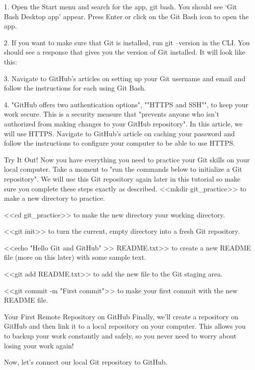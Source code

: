             1. Open the Start menu and search for the app, git bash. You should see ‘Git Bash Desktop app’ appear. Press Enter or click on the Git Bash icon to open the app.

            2. If you want to make sure that Git is installed, run git --version in the CLI. You should see a response that gives you the version of Git installed. It will look like this:

            3. Navigate to GitHub’s articles on setting up your Git username and email and follow the instructions for each using Git Bash.

            4. "GitHub offers two authentication options", ""HTTPS and SSH"", to keep your work secure. This is a security measure that "prevents anyone who isn’t authorized from making changes to your GitHub repository". In this article, we will use HTTPS. Navigate to GitHub’s article on caching your password and follow the instructions to configure your computer to be able to use HTTPS.

Try It Out!
        Now you have everything you need to practice your Git skills on your local computer. Take a moment to "run the commands below to initialize a Git repository". We will use this Git repository again later in this tutorial so make sure you complete these steps exactly as described.
            <<mkdir git_practice>> to make a new directory to practice.
            
            <<cd git_practice>> to make the new directory your working directory.
            
            <<git init>> to turn the current, empty directory into a fresh Git repository.
            
            <<echo "Hello Git and GitHub" >> README.txt>> to create a new README file (more on this later) with some sample text.
            
            <<git add README.txt>> to add the new file to the Git staging area.
            
            <<git commit -m "First commit">> to make your first commit with the new README file.

Your First Remote Repository on GitHub
        Finally, we’ll create a repository on GitHub and then link it to a local repository on your computer. This allows you to backup your work constantly and safely, so you never need to worry about losing your work again!

        Now, let’s connect our local Git repository to GitHub.

